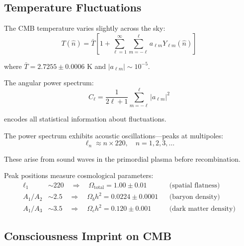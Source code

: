 \subsection{Temperature Fluctuations}

\begin{defn}\label{def:cmb-anisotropies}
The CMB temperature varies slightly across the sky\cite{smoot1992,bennett2003}:
\begin{equation}
T(\hat{n}) = \bar{T} \left[ 1 + \sum_{\ell=1}^\infty \sum_{m=-\ell}^\ell a_{\ell m} Y_{\ell m}(\hat{n}) \right]
\end{equation}

where $\bar{T} = 2.7255 \pm 0.0006$ K and $|a_{\ell m}| \sim 10^{-5}$.

The angular power spectrum:
\begin{equation}
C_\ell = \frac{1}{2\ell + 1} \sum_{m=-\ell}^\ell |a_{\ell m}|^2
\end{equation}

encodes all statistical information about fluctuations.
\end{defn}

\begin{theorem}\label{thm:cmb-peaks}
The power spectrum exhibits acoustic oscillations—peaks at multipoles\cite{hu1996,sunyaev1970}:
\begin{equation}
\ell_n \approx n \times 220, \quad n = 1, 2, 3, \ldots
\end{equation}

These arise from sound waves in the primordial plasma before recombination.

Peak positions measure cosmological parameters\cite{planck2018}:
\begin{align}
\ell_1 &\sim 220 \quad \Rightarrow \quad \Omega_{\text{total}} = 1.00 \pm 0.01 && \text{(spatial flatness)} \\
A_1 / A_2 &\sim 2.5 \quad \Rightarrow \quad \Omega_b h^2 = 0.0224 \pm 0.0001 && \text{(baryon density)} \\
A_1 / A_3 &\sim 3.5 \quad \Rightarrow \quad \Omega_c h^2 = 0.120 \pm 0.001 && \text{(dark matter density)}
\end{align}
\end{theorem}

\subsection{Consciousness Imprint on CMB}

